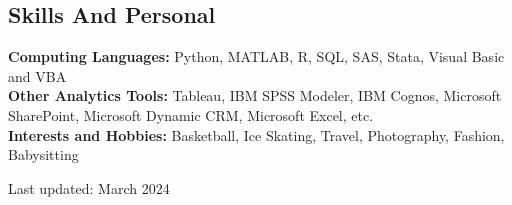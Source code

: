 \documentclass[margin,line]{resume}
\begin{document}
\begin{resume}
    \section{\mysidestyle Skills And Personal}
    \textbf{Computing Languages:} Python, MATLAB, R, SQL, SAS, Stata, Visual Basic and VBA\\
    \textbf{Other Analytics Tools:} Tableau, IBM SPSS Modeler, IBM Cognos, Microsoft SharePoint, Microsoft Dynamic CRM, Microsoft Excel, etc.\\
    \textbf{Interests and Hobbies:} Basketball, Ice Skating, Travel, Photography, Fashion, Babysitting


%
%

\hfill 
\scriptsize Last updated: March 2024
\end{resume}   
\end{document}
